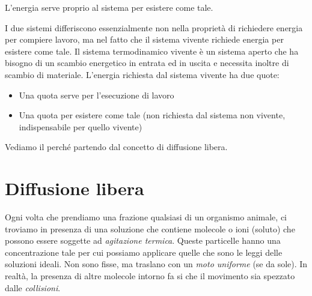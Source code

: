 \documentclass[a4paper,12pt]{article}
\begin{document}
L'energia serve proprio al sistema per esistere come tale.

I due sistemi differiscono essenzialmente non nella proprietà di richiedere energia per compiere lavoro, ma nel fatto che il sistema vivente richiede energia per esistere come tale. Il sistema termodinamico vivente è un sistema aperto che ha bisogno di un scambio energetico in entrata ed in uscita e necessita inoltre di scambio di materiale. L'energia richiesta dal sistema vivente ha due quote:
\begin{itemize}
\item{Una quota serve per l'esecuzione di lavoro}
\item{Una quota per esistere come tale (non richiesta dal sistema non vivente, indispensabile per quello vivente)}
\end{itemize}

Vediamo il perché partendo dal concetto di diffusione libera.

\section{Diffusione libera}
Ogni volta che prendiamo una frazione qualsiasi di un organismo animale, ci troviamo in presenza di una soluzione che contiene molecole o ioni (soluto) che possono essere soggette ad \emph{agitazione termica}. Queste particelle hanno una concentrazione tale per cui possiamo applicare quelle che sono le leggi delle soluzioni ideali. Non sono fisse, ma traslano con un \emph{moto uniforme} (se da sole). In realtà, la presenza di altre molecole intorno fa si che il movimento sia spezzato dalle \emph{collisioni}.
\end{document}
